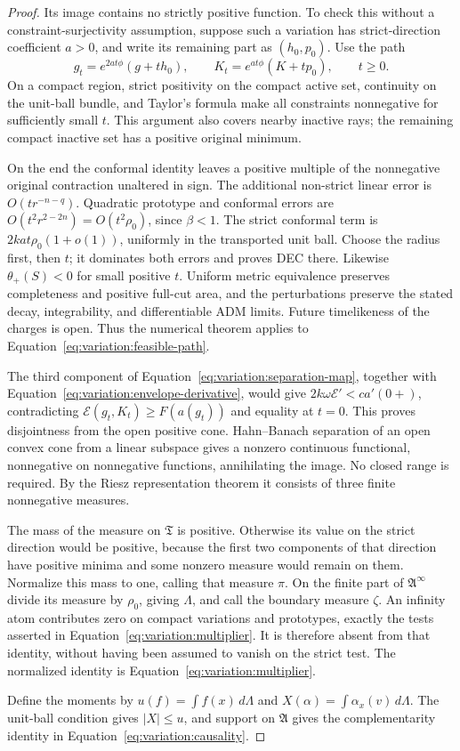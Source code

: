 \begin{proof}
Its image contains no strictly positive function.  To check this
without a constraint-surjectivity assumption, suppose such a variation
has strict-direction coefficient $a>0$, and write its remaining part
as $(h_0,p_0)$.  Use the path
\begin{equation}\label{eq:variation:feasible-path}
 g_t=e^{2at\phi}(g+th_0),\qquad
 K_t=e^{at\phi}(K+tp_0),\qquad t\ge0.
\end{equation}
On a compact region, strict positivity on the compact active set,
continuity on the unit-ball bundle, and Taylor's formula make all
constraints nonnegative for sufficiently small $t$.  This argument
also covers nearby inactive rays; the remaining compact inactive set
has a positive original minimum.

On the end the conformal identity leaves a positive multiple of the
nonnegative original contraction unaltered in sign.  The additional
non-strict linear error is $O(tr^{-n-q})$.  Quadratic prototype and
conformal errors are $O(t^2r^{2-2n})=O(t^2\rho_0)$, since $\beta<1$.
The strict conformal term is $2ka t\rho_0(1+o(1))$, uniformly in the
transported unit ball.  Choose the radius first, then $t$; it dominates
both errors and proves DEC there.  Likewise $\theta_+(S)<0$ for small
positive $t$.  Uniform metric equivalence preserves completeness and
positive full-cut area, and the perturbations preserve the stated
decay, integrability, and differentiable ADM limits.  Future
timelikeness of the charges is open.  Thus the numerical theorem applies
to Equation~\eqref{eq:variation:feasible-path}.

The third component of Equation~\eqref{eq:variation:separation-map}, together
with Equation~\eqref{eq:variation:envelope-derivative}, would give
$2k\omega\mathcal E'<c a'(0+)$, contradicting
$\mathcal E(g_t,K_t)\ge F(a(g_t))$ and equality at $t=0$.
This proves disjointness from the open positive cone.  Hahn--Banach
separation of an open convex cone from a linear subspace gives a
nonzero continuous functional, nonnegative on nonnegative functions,
annihilating the image.  No closed range is required.  By the Riesz
representation theorem it consists of three finite nonnegative
measures.

The mass of the measure on $\mathfrak T$ is positive.  Otherwise its
value on the strict direction would be positive, because the first
two components of that direction have positive minima and some
nonzero measure would remain on them.  Normalize this mass to one,
calling that measure $\pi$.  On the finite part of $\mathfrak A^\infty$
divide its measure by $\rho_0$, giving $\Lambda$, and call the boundary
measure $\zeta$.  An infinity atom contributes zero on compact
variations and prototypes, exactly the tests asserted in
Equation~\eqref{eq:variation:multiplier}.  It is therefore absent from that
identity, without having been assumed to vanish on the strict test.
The normalized identity is Equation~\eqref{eq:variation:multiplier}.

Define the moments by
$u(f)=\int f(x)\,d\Lambda$ and
$X(\alpha)=\int\alpha_x(v)\,d\Lambda$.
The unit-ball condition gives $|X|\le u$, and support on $\mathfrak A$
gives the complementarity identity in
Equation~\eqref{eq:variation:causality}.
\end{proof}

